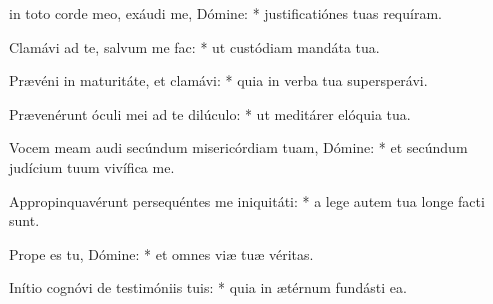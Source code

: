 \begin{psalmus}

 in toto corde meo, exáudi me, Dómine: * justificatiónes tuas requíram.

Clamávi ad te, salvum me fac: * ut custódiam mandáta tua.

Prævéni in maturitáte, et clamávi: * quia in verba tua supersperávi.

Prævenérunt óculi mei ad te dilúculo: * ut meditárer elóquia tua.

Vocem meam audi secúndum misericórdiam tuam, Dómine: * et secúndum judícium tuum vivífica me.

Appropinquavérunt persequéntes me iniquitáti: * a lege autem tua longe facti sunt.

Prope es tu, Dómine: * et omnes viæ tuæ véritas.

Inítio cognóvi de testimóniis tuis: * quia in ætérnum fundásti ea.

\end{psalmus}
